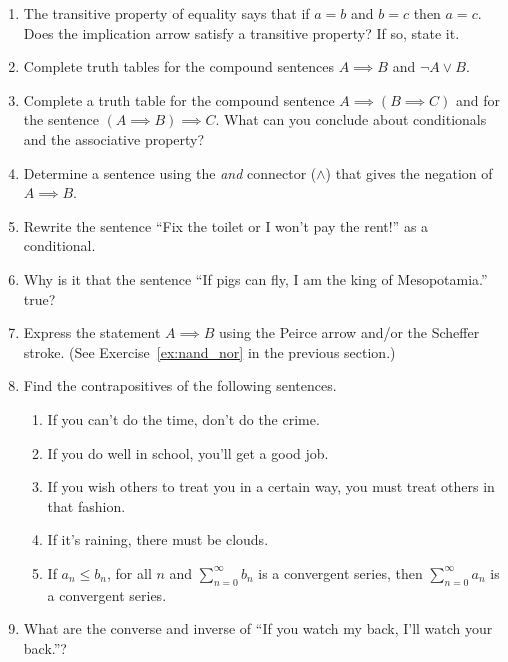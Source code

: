 \begin{enumerate}

\item The transitive property of equality says that if $a=b$ and $b=c$
then $a=c$.  Does the implication arrow satisfy a transitive property?
If so, state it.

\item Complete truth tables for the compound sentences $A \implies B$ and
  ${\lnot}A \lor B$.

\item Complete a truth table for the compound sentence $A \implies (B \implies C)$ and for the sentence $(A \implies B) \implies C$.  What can you conclude
about conditionals and the associative property?

\item Determine a sentence using the {\em and} connector ($\land$) that
gives the negation of $A \implies B$.

\item Rewrite the sentence ``Fix the toilet or I won't pay the rent!'' as
a conditional.

\item Why is it that the sentence ``If pigs can fly, I am the king
of Mesopotamia.'' true?

\item Express the statement $A \implies B$ using the Peirce arrow and/or the
Scheffer stroke. (See Exercise~\ref{ex:nand_nor} in the previous section.)

\item Find the contrapositives of the following sentences.
  \begin{enumerate}
  \item If you can't do the time, don't do the crime.
  \item If you do well in school, you'll get a good job.
  \item If you wish others to treat you in a certain way, you must 
    treat others in that fashion.
  \item If it's raining, there must be clouds.
  \item If $a_n \leq b_n$, for all $n$ and $\sum_{n=0}^\infty b_n$ is a 
convergent series, then $\sum_{n=0}^\infty a_n$ is a convergent series.
  \end{enumerate}

\item What are the converse and inverse of ``If you watch my back, I'll 
watch your back.''?


\end{enumerate}
